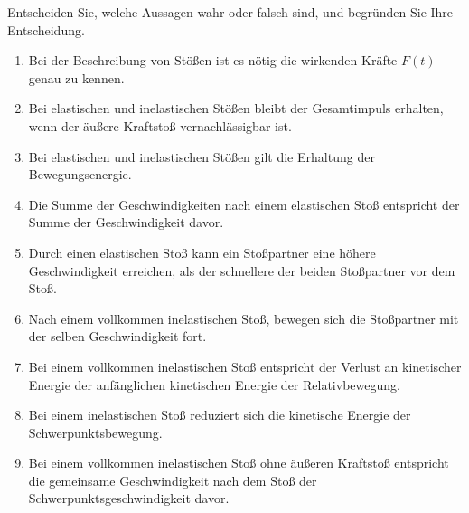 \begin{ExerciseBlock}
Entscheiden Sie, welche Aussagen wahr oder falsch sind, und begründen Sie Ihre Entscheidung.
\begin{enumerate}
\item Bei der Beschreibung von Stößen ist es nötig die wirkenden Kräfte $F(t)$ genau zu kennen.
\item Bei elastischen und inelastischen Stößen bleibt der Gesamtimpuls erhalten, wenn der äußere Kraftstoß vernachlässigbar ist.
\item Bei elastischen und inelastischen Stößen gilt die Erhaltung der Bewegungsenergie.
\item Die Summe der Geschwindigkeiten nach einem elastischen Stoß entspricht der Summe der Geschwindigkeit davor.
\item Durch einen elastischen Stoß kann ein Stoßpartner eine höhere Geschwindigkeit erreichen, als der schnellere der beiden Stoßpartner vor dem Stoß.
\item Nach einem vollkommen inelastischen Stoß, bewegen sich die Stoßpartner mit der selben Geschwindigkeit fort.
\item Bei einem vollkommen inelastischen Stoß entspricht der Verlust an kinetischer Energie der anfänglichen kinetischen Energie der Relativbewegung.
\item Bei einem inelastischen Stoß reduziert sich die kinetische Energie der Schwerpunktsbewegung.
\item Bei einem vollkommen inelastischen Stoß ohne äußeren Kraftstoß entspricht die gemeinsame Geschwindigkeit nach dem Stoß der Schwerpunktsgeschwindigkeit davor.
\end{enumerate}
\end{ExerciseBlock}

